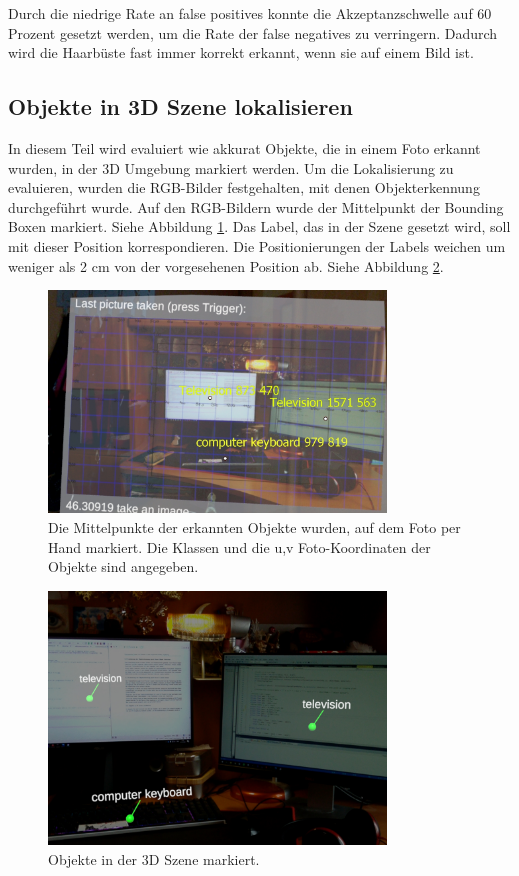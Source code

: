Durch die niedrige Rate an false positives konnte die Akzeptanzschwelle auf 60 Prozent gesetzt werden, um die Rate der false negatives zu verringern. Dadurch wird die Haarbüste fast immer korrekt erkannt, wenn sie auf einem Bild ist.


\subsection{Objekte in 3D Szene lokalisieren}

In diesem Teil wird evaluiert wie akkurat Objekte, die in einem Foto erkannt wurden, in der 3D Umgebung markiert werden.
Um die Lokalisierung zu evaluieren, wurden die RGB-Bilder festgehalten, mit denen Objekterkennung durchgeführt wurde. Auf den RGB-Bildern wurde der Mittelpunkt der Bounding Boxen markiert. Siehe Abbildung \ref{img:markedonimage}. Das Label, das in der Szene gesetzt wird, soll mit dieser Position korrespondieren. Die Positionierungen der Labels weichen um weniger als 2 cm von der vorgesehenen Position ab. Siehe Abbildung \ref{img:labelsszene}. 
\begin{figure}[H]
	\centering
	\includegraphics[width=0.8\textwidth]{images/ML_markedOnImage2.jpg}
	\caption[Erkennt Objekte auf RGB-Bilde markiert]{Die Mittelpunkte der erkannten Objekte wurden, auf dem Foto per Hand markiert. Die Klassen und die u,v Foto-Koordinaten der Objekte sind angegeben.}
	\label{img:markedonimage}
\end{figure}

\begin{figure}[H]
	\centering
	\includegraphics[width=0.8\textwidth]{images/ML_20201014_13.39.00.jpg}
	\caption[Erkannte Objekte in der Szene markiert]{Objekte in der 3D Szene markiert.}
	\label{img:labelsszene}
\end{figure}




